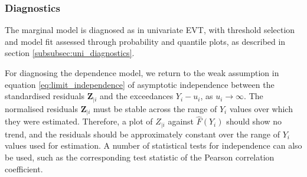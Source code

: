 \documentclass{article}
\numberwithin{equation}{section}
\begin{document}

\subsubsection{Diagnostics} \label{subsubsec:ce_diagnostics}

The marginal model is diagnosed as in univariate EVT, with threshold selection and model fit assessed through probability and quantile plots, as described in section \ref{subsubsec:uni_diagnostics}.

For diagnosing the dependence model, we return to the weak assumption in equation \eqref{eq:limit_independence} of asymptotic independence between the standardised residuals $\bm{Z}_{\mid i}$ and the exceedances $Y_i - u_i$, as $u_i \to \infty$.
The normalised residuals $\bm{Z}_{\mid i}$ must be stable across the range of $Y_i$ values over which they were estimated. 
Therefore, a plot of $Z_{\mid i}$ against $\hat{F}(Y_i)$ should show no trend, and the residuals should be approximately constant over the range of $Y_i$ values used for estimation.
A number of statistical tests for independence can also be used, such as the corresponding test statistic of the Pearson correlation coefficient. 
\end{document}
